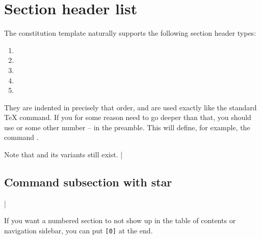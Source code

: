 \documentclass{constitution}
\begin{document}
\label{headers}

\section{Section header list}
The constitution template naturally supports the following section header types:
\begin{enumerate}
    \item \cmdex{\appendix}
    \item \cmdex{\article}
    \item \cmdex{\section}
    \item \cmdex{\subsection}
    \item \cmdex{\subsubsection}
\end{enumerate}
They are indented in precisely that order, and are used exactly like the standard TeX \cmdex{\section} command.
If you for some reason need to go deeper than that, you should use  or some other number -- in the preamble.
This will define, for example, the command \cmdex{\subsubsubsection}.
\par

Note that \cmdex{\section*} and its variants still exist.
\coderunex|\subsection*{Command subsection with star}|

If you want a numbered section to not show up in the table of contents or navigation sidebar,
    you can put \verb|[0]| at the end.
\end{document}
